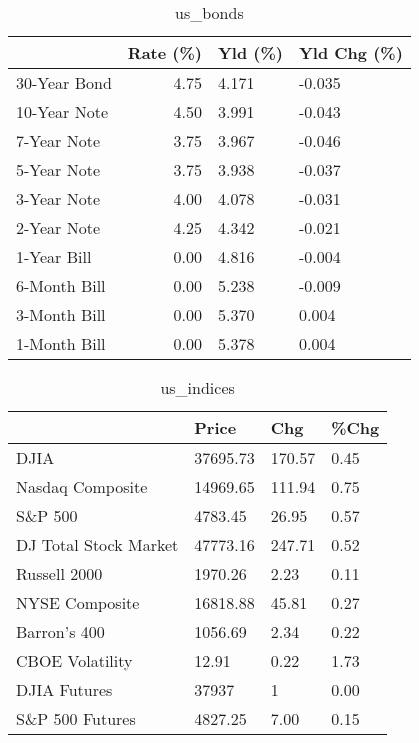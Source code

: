 \documentclass{article}%
\begin{document}
%


\begin{table}[htbp]%
\caption{us\_bonds}%
\centering%
\begin{adjustbox}{width=1\textwidth}%
\begin{tabular}{lrll}
\toprule
             &  Rate (\%) & Yld (\%) & Yld Chg (\%) \\
\midrule
30-Year Bond &      4.75 &   4.171 &      -0.035 \\
10-Year Note &      4.50 &   3.991 &      -0.043 \\
 7-Year Note &      3.75 &   3.967 &      -0.046 \\
 5-Year Note &      3.75 &   3.938 &      -0.037 \\
 3-Year Note &      4.00 &   4.078 &      -0.031 \\
 2-Year Note &      4.25 &   4.342 &      -0.021 \\
 1-Year Bill &      0.00 &   4.816 &      -0.004 \\
6-Month Bill &      0.00 &   5.238 &      -0.009 \\
3-Month Bill &      0.00 &   5.370 &       0.004 \\
1-Month Bill &      0.00 &   5.378 &       0.004 \\
\bottomrule
\end{tabular}
%
\end{adjustbox}%
\end{table}

%


\begin{table}[htbp]%
\caption{us\_indices}%
\centering%
\begin{adjustbox}{width=1\textwidth}%
\begin{tabular}{llll}
\toprule
                      &    Price &    Chg & \%Chg \\
\midrule
                 DJIA & 37695.73 & 170.57 & 0.45 \\
     Nasdaq Composite & 14969.65 & 111.94 & 0.75 \\
              S\&P 500 &  4783.45 &  26.95 & 0.57 \\
DJ Total Stock Market & 47773.16 & 247.71 & 0.52 \\
         Russell 2000 &  1970.26 &   2.23 & 0.11 \\
       NYSE Composite & 16818.88 &  45.81 & 0.27 \\
         Barron's 400 &  1056.69 &   2.34 & 0.22 \\
      CBOE Volatility &    12.91 &   0.22 & 1.73 \\
         DJIA Futures &    37937 &      1 & 0.00 \\
      S\&P 500 Futures &  4827.25 &   7.00 & 0.15 \\
\bottomrule
\end{tabular}
%
\end{adjustbox}%
\end{table}
\end{document}
